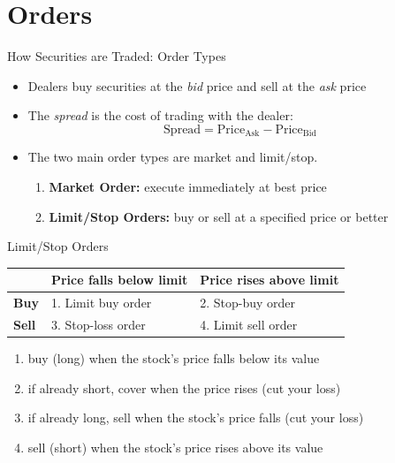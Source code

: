 \documentclass{beamer}
\begin{document}
\section{Orders}
\begin{frame}{How Securities are Traded: Order Types}
\begin{itemize}
\item Dealers buy securities at the \textit{bid} price and sell at the \textit{ask} price
\item The \textit{spread} is the cost of trading with the dealer:
\begin{equation*}
\text{Spread}=\text{Price}_{\text{Ask}}-\text{Price}_{\text{Bid}}
\end{equation*}
\item The two main order types are market and limit/stop.
\begin{enumerate}
\item\textbf{Market Order:} execute immediately at best price
\item\textbf{Limit/Stop Orders:} buy or sell at a specified price or better
\end{enumerate}
\end{itemize}
\end{frame}

\begin{frame}{Limit/Stop Orders}
\begin{center}
\begin{tabular}{l|ll}
& \textbf{Price falls below limit} & \textbf{Price rises above limit} \\ \hline
\textbf{Buy} & 1. Limit buy order & 2. Stop-buy order \\
\textbf{Sell} & 3. Stop-loss order & 4. Limit sell order
\end{tabular}
\end{center}
\begin{enumerate}
	\item buy (long) when the stock's price falls below its value
	\item if already short, cover when the price rises (cut your loss)
	\item if already long, sell when the stock's price falls (cut your loss)
	\item sell (short) when the stock's price rises above its value
\end{enumerate}
\end{frame}
\end{document}
